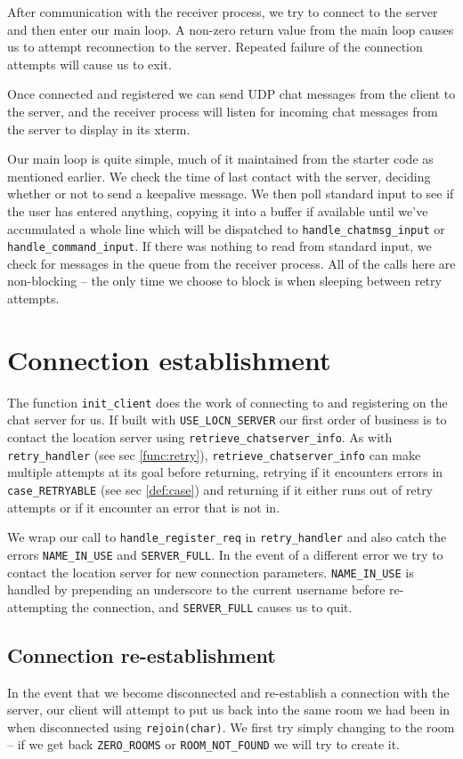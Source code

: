 \documentclass[12pt]{article}
\newcommand{\mono}[1]{\texttt{#1}}
\begin{document}
After communication with the receiver process, we try to connect to the
server and then enter our main loop. A non-zero return value from the
main loop causes us to attempt reconnection to the server. Repeated 
failure of the connection attempts will cause us to exit.

Once connected and registered we can send UDP chat messages from the
client to the server, and the receiver process will listen for incoming
chat messages from the server to display in its xterm.

Our main loop is quite simple, much of it maintained from the starter code
as mentioned earlier. We check the time of last contact with the server,
deciding whether or not to send a keepalive message. We then
poll standard input to see if the user has entered anything, copying it into
a buffer if available until we've accumulated a whole line which will be
dispatched to \mono{handle\_chatmsg\_input} or
\mono{handle\_command\_input}. If there 
was nothing to read from standard input, we check for messages in the
queue from the receiver process. All of the calls here are non-blocking --
the only time we choose to block is when sleeping between retry attempts.

\section{Connection establishment}
\label{sec:init}
The function \mono{init\_client} does the work of connecting to and registering
on the chat server for us.
If built with \mono{USE\_LOCN\_SERVER} our first order of business is to contact
the location server using \mono{retrieve\_chatserver\_info}. As with 
\mono{retry\_handler} (see sec \ref{func:retry}), \mono{retrieve\_chatserver\_info} can
make multiple attempts
at its goal before returning, retrying if it encounters errors in
\mono{case\_RETRYABLE} (see sec \ref{def:case}) and returning if it either runs
out of retry attempts or if it encounter an error that is not in.

We wrap our call to \mono{handle\_register\_req} in \mono{retry\_handler} and
also catch the errors \mono{NAME\_IN\_USE} and \mono{SERVER\_FULL}. In the event
of a different
error we try to contact the location server for new connection parameters.
\mono{NAME\_IN\_USE} is handled by prepending an underscore to the current username
before re-attempting the connection, and \mono{SERVER\_FULL} causes us to quit.

\subsection{Connection re-establishment}
In the event that we become disconnected and re-establish a connection with
the server, our client will attempt to put us back into the same room we had
been in when disconnected using \mono{rejoin(char)}. We first try simply changing to
the room -- if we get back \mono{ZERO\_ROOMS} or \mono{ROOM\_NOT\_FOUND} we will try to
create it.
\end{document}
